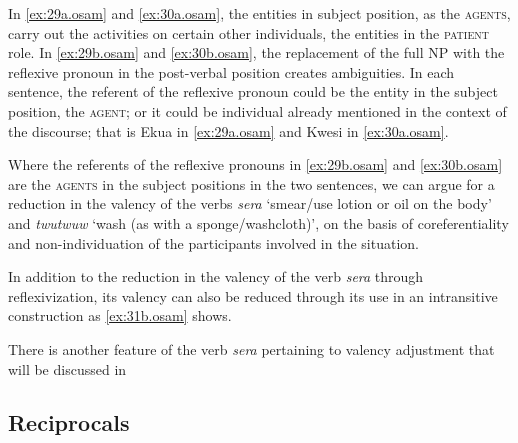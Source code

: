 \documentclass[output=paper]{langsci/langscibook}
\begin{document}
	\z
\z


In \ref{ex:29a.osam} and \ref{ex:30a.osam}, the entities in subject position, as the \textsc{agents}, carry out the activities on certain other individuals, the entities in the \textsc{patient} role. In \ref{ex:29b.osam} and \ref{ex:30b.osam}, the replacement of the full NP with the reflexive pronoun in the post-verbal position creates ambiguities. In each sentence, the referent of the reflexive pronoun could be the entity in the subject position, the \textsc{agent}; or it could be individual already mentioned in the context of the discourse; that is Ekua in \ref{ex:29a.osam} and Kwesi in \ref{ex:30a.osam}.

Where the referents of the reflexive pronouns in \ref{ex:29b.osam} and \ref{ex:30b.osam} are the \textsc{agents} in the subject positions in the two sentences, we can argue for a reduction in the valency of the verbs \textit{sera} `smear/use lotion or oil on the body' and \textit{twutwuw} `wash (as with a sponge/washcloth)', on the basis of coreferentiality and non-individuation of the participants involved in the situation. 

In addition to the reduction in the valency of the verb \textit{sera} through reflexivization, its valency can also be reduced through its use in an intransitive construction as \ref{ex:31b.osam} shows.


\ea
\label{ex:31.osam}
	\z

	\z
\z

There is another feature of the verb \textit{sera} pertaining to valency adjustment that will be discussed in 

\subsection{Reciprocals}\label{§4.2:reciprocals.osam}
\end{document}
